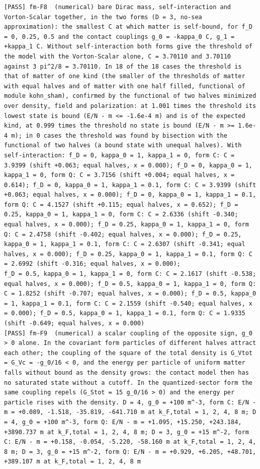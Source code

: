 \documentclass[
  10pt,
]{article}
\begin{document}
\begin{verbatim}
[PASS] fm-F8  (numerical) bare Dirac mass, self-interaction and Vorton-Scalar together, in the two forms (D = 3, no-sea approximation): the smallest C at which matter is self-bound, for f_D = 0, 0.25, 0.5 and the contact couplings g_0 = -kappa_0 C, g_1 = +kappa_1 C. Without self-interaction both forms give the threshold of the model with the Vorton-Scalar alone, C = 3.70110 and 3.70110 against 3 pi^2/8 = 3.70110. In 18 of the 18 cases the threshold is that of matter of one kind (the smaller of the thresholds of matter with equal halves and of matter with one half filled, functional of module kohn_sham), confirmed by the functional of two halves minimized over density, field and polarization: at 1.001 times the threshold its lowest state is bound (E/N - m <= -1.6e-4 m) and is of the expected kind, at 0.999 times the threshold no state is bound (E/N - m >= 1.6e-4 m); in 0 cases the threshold was found by bisection with the functional of two halves (a bound state with unequal halves). With self-interaction: f_D = 0, kappa_0 = 1, kappa_1 = 0, form C: C = 3.9399 (shift +0.063; equal halves, x = 0.000); f_D = 0, kappa_0 = 1, kappa_1 = 0, form Q: C = 3.7156 (shift +0.004; equal halves, x = 0.614); f_D = 0, kappa_0 = 1, kappa_1 = 0.1, form C: C = 3.9399 (shift +0.063; equal halves, x = 0.000); f_D = 0, kappa_0 = 1, kappa_1 = 0.1, form Q: C = 4.1527 (shift +0.115; equal halves, x = 0.652); f_D = 0.25, kappa_0 = 1, kappa_1 = 0, form C: C = 2.6336 (shift -0.340; equal halves, x = 0.000); f_D = 0.25, kappa_0 = 1, kappa_1 = 0, form Q: C = 2.4758 (shift -0.402; equal halves, x = 0.000); f_D = 0.25, kappa_0 = 1, kappa_1 = 0.1, form C: C = 2.6307 (shift -0.341; equal halves, x = 0.000); f_D = 0.25, kappa_0 = 1, kappa_1 = 0.1, form Q: C = 2.6992 (shift -0.316; equal halves, x = 0.000);
f_D = 0.5, kappa_0 = 1, kappa_1 = 0, form C: C = 2.1617 (shift -0.538; equal halves, x = 0.000); f_D = 0.5, kappa_0 = 1, kappa_1 = 0, form Q: C = 1.8252 (shift -0.707; equal halves, x = 0.000); f_D = 0.5, kappa_0 = 1, kappa_1 = 0.1, form C: C = 2.1559 (shift -0.540; equal halves, x = 0.000); f_D = 0.5, kappa_0 = 1, kappa_1 = 0.1, form Q: C = 1.9335 (shift -0.649; equal halves, x = 0.000)
[PASS] fm-F9  (numerical) a scalar coupling of the opposite sign, g_0 > 0 alone. In the covariant form particles of different halves attract each other; the coupling of the square of the total density is G_Vtot = G_Vc = -g_0/16 < 0, and the energy per particle of uniform matter falls without bound as the density grows: the contact model then has no saturated state without a cutoff. In the quantized-sector form the same coupling repels (G_Stot = 15 g_0/16 > 0) and the energy per particle rises with the density. D = 4, g_0 = +100 m^-3, form C: E/N - m = +0.089, -1.518, -35.819, -641.710 m at k_F,total = 1, 2, 4, 8 m; D = 4, g_0 = +100 m^-3, form Q: E/N - m = +1.095, +15.250, +243.184, +3890.737 m at k_F,total = 1, 2, 4, 8 m; D = 3, g_0 = +15 m^-2, form C: E/N - m = +0.158, -0.054, -5.220, -58.160 m at k_F,total = 1, 2, 4, 8 m; D = 3, g_0 = +15 m^-2, form Q: E/N - m = +0.929, +6.205, +48.701, +389.107 m at k_F,total = 1, 2, 4, 8 m
\end{verbatim}
\end{document}

